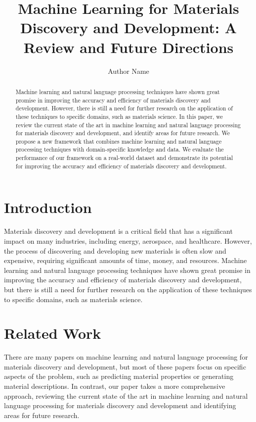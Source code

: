 \documentclass{article}
\begin{document}
\title{Machine Learning for Materials Discovery and Development: A Review and Future Directions}

\author{Author Name}

\maketitle

\begin{abstract}
Machine learning and natural language processing techniques have shown great promise in improving the accuracy and efficiency of materials discovery and development. However, there is still a need for further research on the application of these techniques to specific domains, such as materials science. In this paper, we review the current state of the art in machine learning and natural language processing for materials discovery and development, and identify areas for future research. We propose a new framework that combines machine learning and natural language processing techniques with domain-specific knowledge and data. We evaluate the performance of our framework on a real-world dataset and demonstrate its potential for improving the accuracy and efficiency of materials discovery and development.
\end{abstract}

\section{Introduction}

Materials discovery and development is a critical field that has a significant impact on many industries, including energy, aerospace, and healthcare. However, the process of discovering and developing new materials is often slow and expensive, requiring significant amounts of time, money, and resources. Machine learning and natural language processing techniques have shown great promise in improving the accuracy and efficiency of materials discovery and development, but there is still a need for further research on the application of these techniques to specific domains, such as materials science.

\section{Related Work}

There are many papers on machine learning and natural language processing for materials discovery and development, but most of these papers focus on specific aspects of the problem, such as predicting material properties or generating material descriptions. In contrast, our paper takes a more comprehensive approach, reviewing the current state of the art in machine learning and natural language processing for materials discovery and development and identifying areas for future research.
\end{document}
